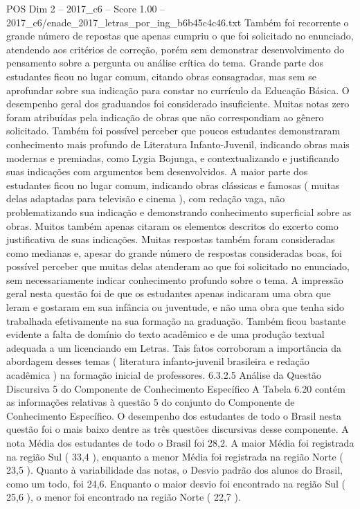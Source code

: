 \begin{textsample}{POS Dim 2 – 2017\_c6 – Score 1.00 – 2017\_c6/enade\_2017\_letras\_por\_ing\_b6b45c4c46.txt}
Também foi recorrente o grande número de repostas que apenas cumpriu o que foi solicitado no enunciado, atendendo aos critérios de correção, porém sem demonstrar desenvolvimento do pensamento sobre a pergunta ou análise crítica do tema.
Grande parte dos estudantes ficou no lugar comum, citando obras consagradas, mas sem se aprofundar sobre sua indicação para constar no currículo da Educação Básica.
O desempenho geral dos graduandos foi considerado insuficiente.
Muitas notas zero foram atribuídas pela indicação de obras que não correspondiam ao gênero solicitado.
Também foi possível perceber que poucos estudantes demonstraram conhecimento mais profundo de Literatura Infanto-Juvenil, indicando obras mais modernas e premiadas, como Lygia Bojunga, e contextualizando e justificando suas indicações com argumentos bem desenvolvidos.
A maior parte dos estudantes ficou no lugar comum, indicando obras clássicas e famosas ( muitas delas adaptadas para televisão e cinema ), com redação vaga, não problematizando sua indicação e demonstrando conhecimento superficial sobre as obras.
Muitos também apenas citaram os elementos descritos do excerto como justificativa de suas indicações.
Muitas respostas também foram consideradas como medianas e, apesar do grande número de respostas consideradas boas, foi possível perceber que muitas delas atenderam ao que foi solicitado no enunciado, sem necessariamente indicar conhecimento profundo sobre o tema.
A impressão geral nesta questão foi de que os estudantes apenas indicaram uma obra que leram e gostaram em sua infância ou juventude, e não uma obra que tenha sido trabalhada efetivamente na sua formação na graduação.
Também ficou bastante evidente a falta de domínio do texto acadêmico e de uma produção textual adequada a um licenciando em Letras.
Tais fatos corroboram a importância da abordagem desses temas ( literatura infanto-juvenil brasileira e redação acadêmica ) na formação inicial de professores. 6.3.2.5 Análise da Questão Discursiva 5 do Componente de Conhecimento Específico A Tabela 6.20 contém as informações relativas à questão 5 do conjunto do Componente de Conhecimento Específico.
O desempenho dos estudantes de todo o Brasil nesta questão foi o mais baixo dentre as três questões discursivas desse componente.
A nota Média dos estudantes de todo o Brasil foi 28,2.
A maior Média foi registrada na região Sul ( 33,4 ), enquanto a menor Média foi registrada na região Norte ( 23,5 ).
Quanto à variabilidade das notas, o Desvio padrão dos alunos do Brasil, como um todo, foi 24,6.
Enquanto o maior desvio foi encontrado na região Sul ( 25,6 ), o menor foi encontrado na região Norte ( 22,7 ).

\end{textsample}
